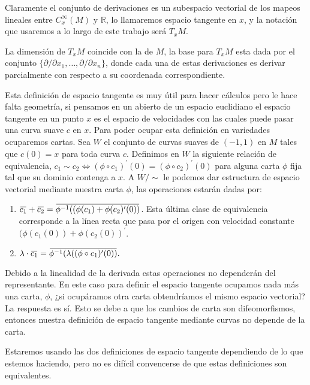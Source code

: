 \documentclass{report}
\theoremstyle{definition}
\newcommand{\overbar}[1]{\mkern 1.5mu\overline{\mkern-1.5mu#1\mkern-1.5mu}\mkern 1.5mu}
\begin{document}
Claramente el conjunto de derivaciones es un subespacio vectorial de los mapeos lineales entre $C^\infty_x (M)$ y $\mathbb{R}$, lo llamaremos espacio tangente en $x$, y la notaci\'on que usaremos a lo largo de este trabajo ser\'a $T_x M$. 

La dimensi\'on de $T_x M$ coincide con la de $M$, la base para $T_x M$ esta dada por el conjunto $\{ \partial / \partial x_1, \dots , \partial / \partial x_n \}$, donde cada una de estas derivaciones es derivar parcialmente con respecto a su coordenada correspondiente. 

Esta definici\'on de espacio tangente es muy \'util para hacer c\'alculos pero le hace falta geometr\'ia, si pensamos en un abierto de un espacio euclidiano el espacio tangente en un punto $x$ es el espacio de velocidades con las cuales puede pasar una curva suave $c$ en $x$. Para poder ocupar esta definici\'on en variedades ocuparemos cartas. Sea $W$ el conjunto de curvas suaves de $(-1, 1)$ en $M$ tales que $c(0) =x$ para toda curva $c$. Definimos en $W$ la siguiente relaci\'on de equivalencia, $c_1 \sim c_2 \iff   (\phi \circ c_1)^\prime (0) = (\phi \circ c_2)^\prime (0)$ para alguna carta $\phi$ fija tal que su dominio contenga a $x$. A $W/ \sim$ le podemos dar estructura de espacio vectorial mediante nuestra carta $\phi$, las operaciones estar\'an dadas por: 

\begin{enumerate}

\item $\overbar{c_1} + \overbar{c_2} = \overbar{ \phi^{-1} ((\phi (c_1 ) + \phi (c_2 )^\prime (0))}$. Esta \'ultima clase de equivalencia corresponde a la  l\'inea recta que pasa por el origen con velocidad constante $(\phi (c_1 (0)) + \phi (c_2 (0))^\prime$. 

\item $\lambda \cdot \overbar{c_1} = \overbar{ \phi^{-1} (\lambda ((\phi \circ c_1)^\prime (0))} .$ 
\end{enumerate}

Debido a la linealidad de la derivada estas operaciones no depender\'an del representante. En este caso para definir el espacio tangente ocupamos nada m\'as una carta, $\phi$, ¿si ocup\'aramos otra carta obtendr\'iamos el mismo espacio vectorial? La respuesta es s\'i. Esto se debe a que los cambios de carta son difeomorfismos, entonces nuestra definici\'on de espacio tangente mediante curvas no depende de la carta. 

Estaremos usando las dos definiciones de espacio tangente dependiendo de lo que estemos haciendo, pero no es dif\'icil convencerse de que estas definiciones son equivalentes.
\end{document}

